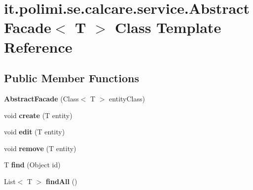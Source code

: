 \hypertarget{classit_1_1polimi_1_1se_1_1calcare_1_1service_1_1AbstractFacade}{}\section{it.\+polimi.\+se.\+calcare.\+service.\+Abstract\+Facade$<$ T $>$ Class Template Reference}
\label{classit_1_1polimi_1_1se_1_1calcare_1_1service_1_1AbstractFacade}
\subsection*{Public Member Functions}
\begin{DoxyCompactItemize}
\item 
\hypertarget{classit_1_1polimi_1_1se_1_1calcare_1_1service_1_1AbstractFacade_a171e8550e9a2857b706c6540c0a4db7c}{}{\bfseries Abstract\+Facade} (Class$<$ T $>$ entity\+Class)\label{classit_1_1polimi_1_1se_1_1calcare_1_1service_1_1AbstractFacade_a171e8550e9a2857b706c6540c0a4db7c}

\item 
\hypertarget{classit_1_1polimi_1_1se_1_1calcare_1_1service_1_1AbstractFacade_ab30809ca3e3ecf5bb7094f7135a89302}{}void {\bfseries create} (T entity)\label{classit_1_1polimi_1_1se_1_1calcare_1_1service_1_1AbstractFacade_ab30809ca3e3ecf5bb7094f7135a89302}

\item 
\hypertarget{classit_1_1polimi_1_1se_1_1calcare_1_1service_1_1AbstractFacade_a8624832a4af75c161a4ed6d0e4ccf820}{}void {\bfseries edit} (T entity)\label{classit_1_1polimi_1_1se_1_1calcare_1_1service_1_1AbstractFacade_a8624832a4af75c161a4ed6d0e4ccf820}

\item 
\hypertarget{classit_1_1polimi_1_1se_1_1calcare_1_1service_1_1AbstractFacade_a77fbd54bb43b444a2ebc237aa80b6e89}{}void {\bfseries remove} (T entity)\label{classit_1_1polimi_1_1se_1_1calcare_1_1service_1_1AbstractFacade_a77fbd54bb43b444a2ebc237aa80b6e89}

\item 
\hypertarget{classit_1_1polimi_1_1se_1_1calcare_1_1service_1_1AbstractFacade_a85044ef68e2995e7aa807913f4d2117d}{}T {\bfseries find} (Object id)\label{classit_1_1polimi_1_1se_1_1calcare_1_1service_1_1AbstractFacade_a85044ef68e2995e7aa807913f4d2117d}

\item 
\hypertarget{classit_1_1polimi_1_1se_1_1calcare_1_1service_1_1AbstractFacade_ad1c02d72ff2d7ac725feb6a472f78d61}{}List$<$ T $>$ {\bfseries find\+All} ()\label{classit_1_1polimi_1_1se_1_1calcare_1_1service_1_1AbstractFacade_ad1c02d72ff2d7ac725feb6a472f78d61}


\end{DoxyCompactItemize}
